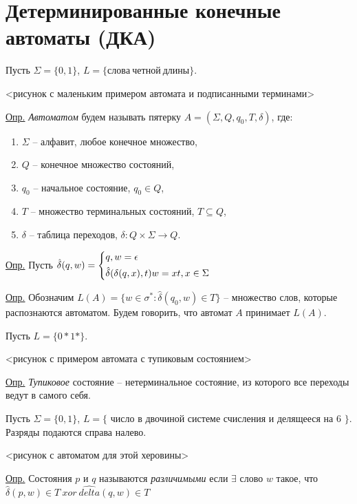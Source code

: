 \section{Детерминированные конечные автоматы (ДКА)}

Пусть $ \Sigma = \{0, 1\} $, $ L = \{слова\ четной\ длины \} $.

<рисунок с маленьким примером автомата и подписанными терминами>

\underline{Опр.} \textit{Автоматом} будем называть пятерку $ A = (\Sigma, Q, q_0, T, \delta) $, где:

\begin{enumerate}
	\item $ \Sigma $ -- алфавит, любое конечное множество,
	
	\item $ Q $ -- конечное множество состояний,
	
	\item $ q_0 $ -- начальное состояние, $ q_0 \in Q $,
	
	\item $ T $ -- множество терминальных состояний, $ T \subseteq Q $,
	
	\item $ \delta $ -- таблица переходов, $ \delta \colon Q \times \Sigma \to Q $.
\end{enumerate}

\underline{Опр.} Пусть $ \hat{\delta} (q, w) = \left\{\begin{aligned}&q, w = \epsilon\\&\hat{\delta}(\delta(q, x), t) w=xt, x \in \Sigma\\\end{aligned}\right. $

\underline{Опр.} Обозначим $ L(A) = \{ w \in \sigma^* \colon \hat{\delta}(q_0, w) \in T \} $ -- множество слов, которые распознаются автоматом. Будем говорить, что автомат $ A $ принимает $ L(A) $.


\bigskip


Пусть $ L = \{0*1*\} $. 

<рисунок с примером автомата с тупиковым состоянием>

\underline{Опр.} \textit{Тупиковое} состояние -- нетерминальное состояние, из которого все переходы ведут в самого себя. 


\bigskip


Пусть $ \Sigma = \{0, 1\} $, $ L = \{$ число в двочиной системе счисления и делящееся на $ 6 $ $\} $. Разряды подаются справа налево.

<рисунок с автоматом для этой херовины>

\underline{Опр.} Состояния $ p $ и $ q $ называются \textit{различимыми} если $ \exists $ слово $ w $ такое, что $ \hat{\delta}(p, w) \in T\ xor\ \hat{delta}(q, w) \in T $


